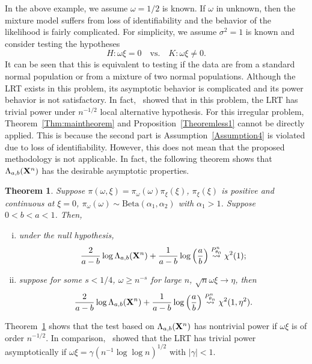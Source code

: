 \documentclass[11pt]{article}
\theoremstyle{plain}
\newtheorem{theorem}{\quad\quad Theorem}
\theoremstyle{definition}
\theoremstyle{remark}
\begin{document}
In the above example, we assume $\omega=1/2$ is known.
If $\omega$ in unknown, then the mixture model suffers from loss of identifiability and the behavior of the likelihood is fairly complicated.
For simplicity, we assume $\sigma^2=1$ is known and consider testing the hypotheses
\begin{equation}
    H:\omega \xi=0
    \quad \text{vs.}\quad
    K:\omega \xi \neq 0.
    \label{newHy}
\end{equation}
It can be seen that this is equivalent to testing if the data are from a standard normal population or from a mixture of two normal populations.
Although the LRT exists in this problem, its asymptotic behavior is complicated and its power behavior is not satisfactory.
In fact,~\cite{HALL2005158} showed that in this problem, the LRT has trivial power under $n^{-1/2}$ local alternative hypothesis. 
For this irregular problem, Theorem~\ref{Thm:maintheorem} and Proposition~\ref{Theoremless1} cannot be directly applied.
This is because the second part is Assumption~\ref{Assumption4} is violated due to loss of identifiability.
However, this does not mean that the proposed methodology is not applicable.
In fact, the following theorem shows that $\Lambda_{a,b}(\mathbf{X}^n)$ has the desirable asymptotic properties.

\begin{theorem}
    Suppose $\pi(\omega,\xi)=\pi_{\omega}(\omega) \pi_{\xi}(\xi)$, $\pi_\xi(\xi)$ is positive and continuous at $\xi=0$,
    $\pi_\omega(\omega)\sim \text{Beta}(\alpha_1,\alpha_2)$ with $\alpha_1>1$.
    Suppose $ 0 < b < a < 1 $.
    Then,
    \begin{enumerate}[(i)]
        \item
    under the null hypothesis,
    \begin{equation*}
        \frac{2}{a-b}\log \Lambda_{a,b} (\mathbf{X}^n) + \frac{1}{a-b} \log \left(\frac a b \right) \overset{P^n_{\theta_0}}{\rightsquigarrow}\chi^2(1);
    \end{equation*}
\item
    suppose for some $s<1/4$, $\omega \geq n^{-s}$ for large $n$, $\sqrt{n}\omega \xi \to \eta$, then
    \begin{equation*}
        \frac{2}{a-b} \log \Lambda_{a,b} (\mathbf{X}^n) + \frac{1}{a-b} \log \left(\frac a b \right) \overset{P^n_{\theta_n}}{\rightsquigarrow}  \chi^2(1,\eta^2).
    \end{equation*}
\end{enumerate}
    \label{mixtureThm}
\end{theorem}
Theorem~\ref{mixtureThm} shows that the test based on $\Lambda_{a,b}(\mathbf{X}^n)$ has nontrivial power if $\omega \xi $ is of order $n^{-1/2}$. 
In comparison,~\cite{HALL2005158} showed that the LRT has  trivial power asymptotically if $\omega \xi=\gamma(n^{-1}\log \log n)^{1/2}$ with $|\gamma|< 1$.
\end{document}
